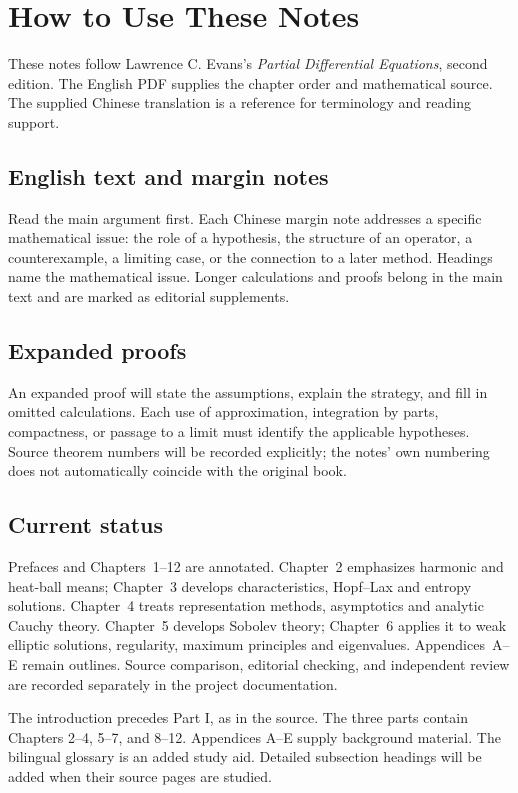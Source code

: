 \chapter*{How to Use These Notes}
These notes follow Lawrence C. Evans's \emph{Partial Differential Equations},
second edition. The English PDF supplies the chapter order and mathematical
source. The supplied Chinese translation is a reference for terminology and
reading support.

\section*{English text and margin notes}
Read the main argument first. Each Chinese margin note addresses a specific
mathematical issue: the role of a hypothesis, the structure of an operator,
a counterexample, a limiting case, or the connection to a later method.
Headings name the mathematical issue. Longer calculations and proofs belong
in the main text and are marked as editorial supplements.

\section*{Expanded proofs}
An expanded proof will state the assumptions, explain the strategy, and fill
in omitted calculations. Each use of approximation, integration by parts,
compactness, or passage to a limit must identify the applicable hypotheses.
Source theorem numbers will be recorded explicitly; the notes' own numbering
does not automatically coincide with the original book.

\section*{Current status}
Prefaces and Chapters~1--12 are annotated.
Chapter~2 emphasizes harmonic and heat-ball means; Chapter~3 develops
characteristics, Hopf--Lax and entropy solutions. Chapter~4 treats
representation methods, asymptotics and analytic Cauchy theory.
Chapter~5 develops Sobolev theory; Chapter~6 applies it to weak elliptic
solutions, regularity, maximum principles and eigenvalues.
Appendices~A--E remain outlines.
Source comparison, editorial checking, and independent review are
recorded separately in the project documentation.

The introduction precedes Part I, as in the source. The three parts contain
Chapters 2--4, 5--7, and 8--12. Appendices A--E supply background material.
The bilingual glossary is an added study aid. Detailed subsection headings
will be added when their source pages are studied.

